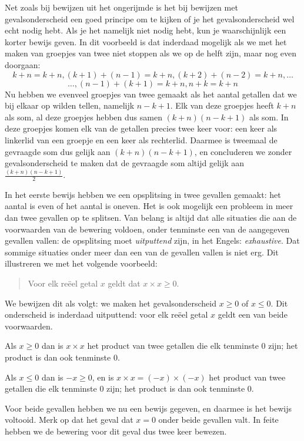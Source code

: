 Net zoals bij bewijzen uit het ongerijmde is het bij bewijzen met gevalsonderscheid een goed principe om te kijken of je het gevalsonderscheid wel echt nodig hebt. Als je het namelijk niet nodig hebt, kun je waarschijnlijk een korter bewijs geven. In dit voorbeeld is dat inderdaad mogelijk als we met het maken van groepjes van twee niet stoppen als we op de helft zijn, maar nog even doorgaan:
$$k+n=k+n,(k+1)+(n-1)=k+n,(k+2)+(n-2)=k+n,\ldots$$
$$\ldots,(n-1)+(k+1)=k+n,n+k=k+n$$
Nu hebben we evenveel groepjes van twee gemaakt als het aantal getallen dat we bij elkaar op wilden tellen, namelijk $n-k+1$. Elk van deze groepjes heeft $k+n$ als som, al deze groepjes hebben dus samen $(k+n)(n-k+1)$ als som. In deze groepjes komen elk van de getallen precies twee keer voor: een keer als linkerlid van een groepje en een keer als rechterlid. Daarmee is tweemaal de gevraagde som dus gelijk aan $(k+n)(n-k+1)$, en concluderen we zonder gevalsonderscheid te maken dat de gevraagde som altijd gelijk aan $\frac{(k+n)(n-k+1)}{2}$.

In het eerste bewijs hebben we een opsplitsing in twee gevallen gemaakt: het aantal is even of het aantal is oneven. Het is ook mogelijk een probleem in meer dan twee gevallen op te splitsen. Van belang is altijd dat alle situaties die aan de voorwaarden van de bewering voldoen, onder tenminste een van de aangegeven gevallen vallen: de opsplitsing moet \textit{uitputtend} zijn, in het Engels: \textit{exhaustive}. Dat sommige situaties onder meer dan een van de gevallen vallen is niet erg. Dit illustreren we met het volgende voorbeeld:
\begin{quote}
    Voor elk re\"eel getal $x$ geldt dat $x\times x\geq 0$.
\end{quote}
We bewijzen dit als volgt: we maken het gevalsonderscheid $x\geq 0$ of $x\leq 0$. Dit onderscheid is inderdaad uitputtend: voor elk re\"eel getal $x$ geldt een van beide voorwaarden.

Als $x\geq 0$ dan is $x\times x$ het product van twee getallen die elk tenminste $0$ zijn; het product is dan ook tenminste 0.

Als $x\leq 0$ dan is $-x\geq 0$, en is $x\times x=(-x)\times(-x)$ het product van twee getallen die elk tenminste 0 zijn; het product is dan ook tenminste 0.

Voor beide gevallen hebben we nu een bewijs gegeven, en daarmee is het bewijs voltooid. Merk op dat het geval dat $x=0$ onder beide gevallen valt. In feite hebben we de bewering voor dit geval dus twee keer bewezen.

